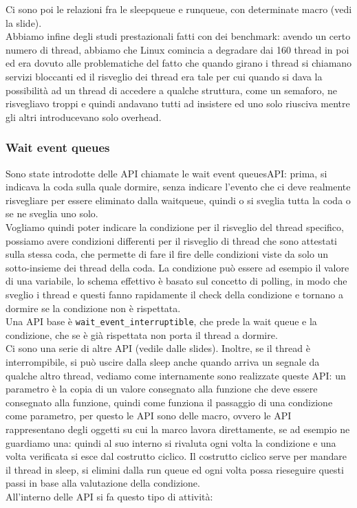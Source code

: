 \documentclass[12pt, oneside]{extbook}
\begin{document}
Ci sono poi le relazioni fra le sleepqueue e runqueue, con determinate macro (vedi la slide).\\Abbiamo infine degli studi prestazionali fatti con dei benchmark: avendo un certo numero di thread, abbiamo che Linux comincia a degradare dai 160 thread in poi ed era dovuto alle problematiche del fatto che quando girano i thread si chiamano servizi bloccanti ed il risveglio dei thread era tale per cui quando si dava la possibilità ad un thread di accedere a qualche struttura, come un semaforo, ne risvegliavo troppi e quindi andavano tutti ad insistere ed uno solo riusciva mentre gli altri introducevano solo overhead.
\subsubsection{Wait event queues}
Sono state introdotte delle API chiamate le wait event queuesAPI: prima, si indicava la coda sulla quale dormire, senza indicare l'evento che ci deve realmente risvegliare per essere eliminato dalla waitqueue, quindi o si sveglia tutta la coda o se ne sveglia uno solo.\\Vogliamo quindi poter indicare la condizione per il risveglio del thread specifico, possiamo avere condizioni differenti per il risveglio di thread che sono attestati sulla stessa coda, che permette di fare il fire delle condizioni viste da solo un sotto-insieme dei thread della coda. La condizione può essere ad esempio il valore di una variabile, lo schema effettivo è basato sul concetto di polling, in modo che sveglio i thread e questi fanno rapidamente il check della condizione e tornano a dormire se la condizione non è rispettata.\\Una API base è \texttt{wait\_event\_interruptible}, che prede la wait queue e la condizione, che se è già rispettata non porta il thread a dormire.\\Ci sono una serie di altre API (vedile dalle slides). Inoltre, se il thread è interrompibile, si può uscire dalla sleep anche quando arriva un segnale da qualche altro thread, vediamo come internamente sono realizzate queste API: un parametro è la copia di un valore consegnato alla funzione che deve essere consegnato alla funzione, quindi come funziona il passaggio di una condizione come parametro, per questo le API sono delle macro, ovvero le API rappresentano degli oggetti su cui la marco lavora direttamente, se ad esempio ne guardiamo una:
quindi al suo interno si rivaluta ogni volta la condizione e una volta verificata si esce dal costrutto ciclico. Il costrutto ciclico serve per mandare il thread in sleep, si elimini dalla run queue ed ogni volta possa rieseguire questi passi in base alla valutazione della condizione.\\All'interno delle API si fa questo tipo di attività:
\end{document}
